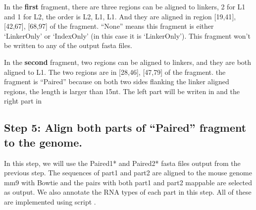 \documentclass[letterpaper,10pt,english]{sphinxmanual}
\begin{document}
In the \textbf{first} fragment, there are three regions can be aligned to linkers, 2 for L1 and 1 for L2, the order is L2, L1, L1. And they are aligned in region {[}19,41{]}, {[}42,67{]}, {[}68,97{]} of the fragment. ``None'' means this fragment is either `LinkerOnly' or `IndexOnly' (in this case it is `LinkerOnly'). This fragment won't be written to any of the output fasta files.

In the \textbf{second} fragment, two regions can be aligned to linkers, and they are both aligned to L1. The two regions are in {[}28,46{]}, {[}47,79{]} of the fragment. the fragment is ``Paired'' because on both two sides flanking the linker aligned regions, the length is larger than 15nt. The left part will be writen in  and the right part in 


\subsection{Step 5: Align both parts of ``Paired'' fragment to the genome.}
\label{Analysis_pipeline:step-5-align-both-parts-of-paired-fragment-to-the-genome}\label{Analysis_pipeline:step5}
In this step, we will use the Paired1* and Paired2* fasta files output from the previous step. The sequences of part1 and part2 are aligned to the mouse genome mm9 with Bowtie and the pairs with both part1 and part2 mappable are selected as output. We also annotate the RNA types of each part in this step.
All of these are implemented using script .
\end{document}
